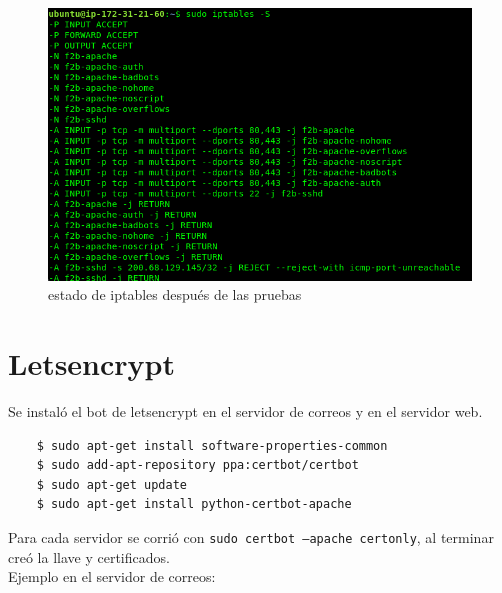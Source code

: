\documentclass[9pt]{article}
\begin{document}
\begin{figure}[H]
  \centering
  \includegraphics[scale=0.3]{fail2ban/new_iptables_with_ban}
  \caption{estado de iptables después de las pruebas}
\end{figure}

\section{Letsencrypt}

Se instaló el bot de \textsf{letsencrypt} en el servidor de correos y en el servidor web.

\begin{verbatim}
    $ sudo apt-get install software-properties-common
    $ sudo add-apt-repository ppa:certbot/certbot
    $ sudo apt-get update
    $ sudo apt-get install python-certbot-apache 
\end{verbatim}

Para cada servidor se corrió con \texttt{sudo certbot --apache certonly}, al terminar creó la llave y certificados. \\

Ejemplo en el servidor de correos:
\end{document}
